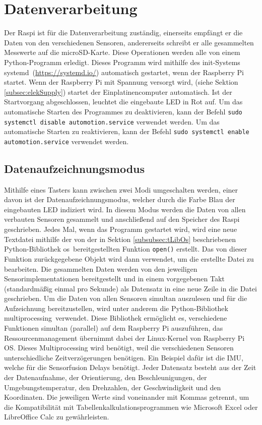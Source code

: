 \section{Datenverarbeitung}
\label{sec:Datenverarbeitung}
Der \ac{Raspi} ist für die Datenverarbeitung zuständig, einerseits empfängt er die Daten von den verschiedenen Sensoren, andererseits schreibt er alle gesammelten Messwerte auf die microSD-Karte. Diese Operationen werden alle von einem Python-Programm erledigt. Dieses Programm wird mithilfe des init-Systems \glqq systemd\grqq\ (\url{https://systemd.io/}) automatisch gestartet, wenn der Raspberry Pi startet. Wenn der Raspberry Pi mit Spannung versorgt wird, (siehe Sektion \ref{subsec:elekSupply}) startet der Einplatinencomputer automatisch. Ist der Startvorgang abgeschlossen, leuchtet die eingebaute \ac{LED} in Rot auf. Um das automatische Starten des Programmes zu deaktivieren, kann der Befehl \verb|sudo systemctl disable automotion.service| verwendet werden. Um das automatische Starten zu reaktivieren, kann der Befehl \verb|sudo systemctl enable automotion.service| verwendet werden.
\subsection{Datenaufzeichnungsmodus}
\label{subsec:Datenaufzeichnungsmodus}
Mithilfe eines Tasters kann zwischen zwei Modi umgeschalten werden, einer davon ist der Datenaufzeichnungsmodus, welcher durch die Farbe Blau der eingebauten \ac{LED} indiziert wird. In diesem Modus werden die Daten von allen verbauten Sensoren gesammelt und anschließend auf den Speicher des \ac{Raspi} geschrieben. Jedes Mal, wenn das Programm gestartet wird, wird eine neue Textdatei mithilfe der von der in Sektion \ref{subsubsec:tLibOs} beschriebenen Python-Bibliothek \glqq os\grqq\ bereitgestellten Funktion \verb|open()| erstellt. Das von dieser Funktion zurückgegebene Objekt wird dann verwendet, um die erstellte Datei zu bearbeiten. Die gesammelten Daten werden von den jeweiligen Sensorimplementationen bereitgestellt und in einem vorgegebenen Takt (standardmäßig einmal pro Sekunde) als Datensatz in eine neue Zeile in die Datei geschrieben. Um die Daten von allen Sensoren simultan auszulesen und für die Aufzeichnung bereitzustellen, wird unter anderem die Python-Bibliothek \glqq multiprocessing\grqq\ verwendet. Diese Bibliothek ermöglicht es, verschiedene Funktionen simultan (parallel) auf dem Raspberry Pi auszuführen, das Ressourcenmanagement übernimmt dabei der Linux-Kernel von Raspberry Pi OS. Dieses Multiprocessing wird benötigt, weil die verschiedenen Sensoren unterschiedliche Zeitverzögerungen benötigen. Ein Beispiel dafür ist die \ac{IMU}, welche für die Sensorfusion Delays benötigt. Jeder Datensatz besteht aus der Zeit der Datenaufnahme, der Orientierung, den Beschleunigungen, der Umgebungstemperatur, den Drehzahlen, der Geschwindigkeit und den Koordinaten. Die jeweiligen Werte sind voneinander mit Kommas getrennt, um die Kompatibilität mit Tabellenkalkulationsprogrammen wie Microsoft Excel oder LibreOffice Calc zu gewährleisten.
